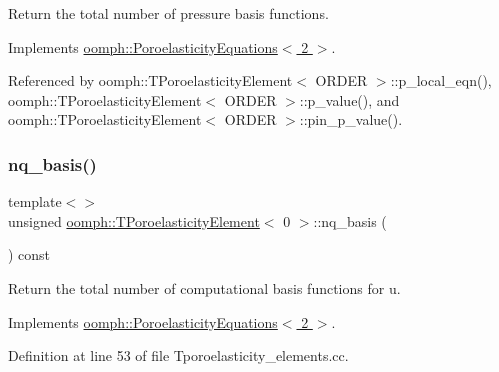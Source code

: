 Return the total number of pressure basis functions. 



Implements \hyperlink{classoomph_1_1PoroelasticityEquations_a44a16186f2923f811623e0cf088ff815}{oomph\+::\+Poroelasticity\+Equations$<$ 2 $>$}.



Referenced by oomph\+::\+T\+Poroelasticity\+Element$<$ O\+R\+D\+E\+R $>$\+::p\+\_\+local\+\_\+eqn(), oomph\+::\+T\+Poroelasticity\+Element$<$ O\+R\+D\+E\+R $>$\+::p\+\_\+value(), and oomph\+::\+T\+Poroelasticity\+Element$<$ O\+R\+D\+E\+R $>$\+::pin\+\_\+p\+\_\+value().

\mbox{\label{classoomph_1_1TPoroelasticityElement_aea11019e66b5f28fbdc3dfb4a538dac1}} 
\subsubsection{\texorpdfstring{nq\+\_\+basis()}{nq\_basis()}\hspace{0.1cm}{\footnotesize\ttfamily [1/3]}}
{\footnotesize\ttfamily template$<$$>$ \\
unsigned \hyperlink{classoomph_1_1TPoroelasticityElement}{oomph\+::\+T\+Poroelasticity\+Element}$<$ 0 $>$\+::nq\+\_\+basis (\begin{DoxyParamCaption}{ }\end{DoxyParamCaption}) const\hspace{0.3cm}{\ttfamily [virtual]}}



Return the total number of computational basis functions for u. 



Implements \hyperlink{classoomph_1_1PoroelasticityEquations_aec90144cc61d817c97bee414e90921af}{oomph\+::\+Poroelasticity\+Equations$<$ 2 $>$}.



Definition at line 53 of file Tporoelasticity\+\_\+elements.\+cc.

\mbox{\label{classoomph_1_1TPoroelasticityElement_a0e7bb4a27c8d609ee6cb5abb6cc63c81}} 

